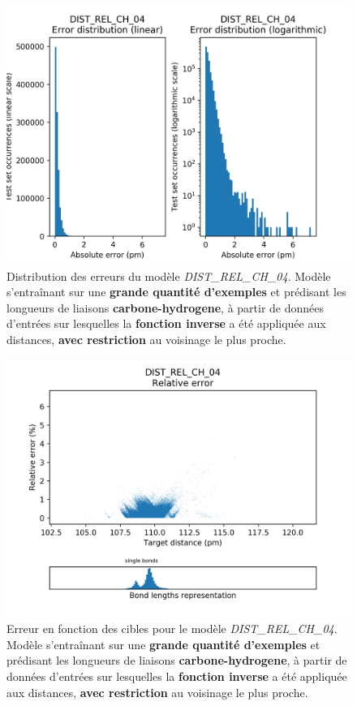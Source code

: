 
\begin{figure}[!h]
	\centering
	
	\includegraphics[scale=0.75]{../figures/DIST_REL_CH_04/DIST_REL_CH_04_distrib_rmse_val.png}	
	
	\caption{Distribution des erreurs du modèle \emph{DIST\_REL\_CH\_04}. Modèle s'entraînant sur une \textbf{grande quantité d'exemples} et prédisant les longueurs de liaisons \textbf{carbone-hydrogene}, à partir de données d'entrées sur lesquelles la \textbf{fonction inverse} a été appliquée aux distances, \textbf{avec restriction} au voisinage le plus proche.}
\end{figure}

\begin{figure}[!h]
	\centering
	
	\includegraphics[scale=0.75]{../figures/DIST_REL_CH_04/DIST_REL_CH_04_distrib_rmse_dist.png}	
	
	\caption{Erreur en fonction des cibles pour le modèle \emph{DIST\_REL\_CH\_04}. Modèle s'entraînant sur une \textbf{grande quantité d'exemples} et prédisant les longueurs de liaisons \textbf{carbone-hydrogene}, à partir de données d'entrées sur lesquelles la \textbf{fonction inverse} a été appliquée aux distances, \textbf{avec restriction} au voisinage le plus proche.}
\end{figure}

